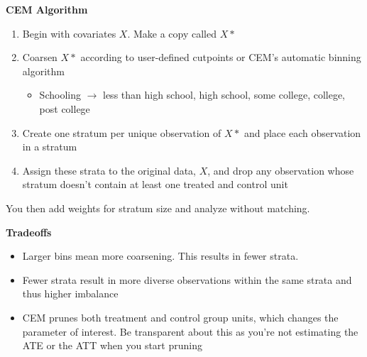 \documentclass[notes=show]{beamer}
\begin{document}
\begin{frame}[plain]
	\begin{center}
	\textbf{CEM Algorithm}
	\end{center}
	
\begin{enumerate}
\item Begin with covariates $X$. Make a copy called $X*$
\item Coarsen $X*$ according to user-defined cutpoints or CEM's automatic binning algorithm
	\begin{itemize}
	\item Schooling $\rightarrow$ less than high school, high school, some college, college, post college
	\end{itemize}
\item Create one stratum per unique observation of $X*$ and place each observation in a stratum
\item Assign these strata to the original data, $X$, and drop any observation whose stratum doesn't contain at least one treated and control unit
\end{enumerate}

You then add weights for stratum size and analyze without matching.

\end{frame}

\begin{frame}[plain]
	\begin{center}
	\textbf{Tradeoffs}
	\end{center}
	
	\begin{itemize}
	\item Larger bins mean more coarsening.  This results in fewer strata.  
	\item Fewer strata result in more diverse observations within the same strata and thus higher imbalance
	\item CEM prunes both treatment and control group units, which changes the parameter of interest.  Be transparent about this as you're not estimating the ATE or the ATT when you start pruning
	\end{itemize}
	
\end{frame}
\end{document}

